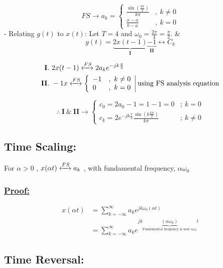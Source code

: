 \documentclass{article}
\begin{document}
{\huge \begin{equation}
        FS \xrightarrow{} a_k =  \left\{
        \begin{array}{ll}
            \frac{\sin(\frac{k\pi}{2})}{k\pi} & , \ k \neq 0 \\
            \frac{x-a}{b-a}                   & , \ k = 0
        \end{array}
        \right.
    \end{equation}}
- Relating $g(t)$ to $x(t)$: Let $T = 4$ and $\omega_0 = \frac{2\pi}{4} = \frac{\pi}{2}$. \&
\begin{equation}
    g(t) = \underbrace{2x (t-1)}_{\mathbf{I}} \underbrace{-1}_{\mathbf{II}} \leftrightarrow C_k
\end{equation}

{\color{red}\begin{align}
    \mathbf{I.} \   & 2x (t-1)  \xleftrightarrow[]{FS} 2a_k e^{-jk\frac{\pi}{2}} \\
    \mathbf{II.} \  & -1 x \xleftrightarrow[]{FS}
    \left\{\begin{array}{ll}
               -1 & , \ k \neq 0 \\
               0  & , \ k = 0
           \end{array}
    \right |\text{using FS analysis equation}
\end{align}}

\begin{equation}
    \therefore \ \mathbf{I \ \& \ II} \xrightarrow{}
    \left\{\begin{array}{ll}
        c_0 = 2a_0 -1 = 1-1 =0                                           & ; \ k=0     \\
        c_k = 2 e^{-jk \frac{\pi}{2}} \frac{\sin(k\frac{k\pi}{2})}{k\pi} & ; \ k\neq 0
    \end{array}\right.
\end{equation}

\subsection{Time Scaling:}
For $\alpha > 0 $ , $x(\alpha t) \xleftrightarrow[]{FS} a_k$ , with fundamental frequency, $\alpha \omega_0$

\subsubsection{\underline{Proof:}}

\begin{align}
    x(\alpha t) & =\sum^{\infty}_{k= - \infty} a_k e^{jk\omega_0 (\alpha t)}                                                                   \\
                & =\sum^{\infty}_{k= - \infty} a_k e^{jk\underbrace{(\alpha \omega_0)}_{\text{Fundemental frequency is now }\alpha \omega_0}t}
\end{align}

\subsection{Time Reversal: }
\end{document}
